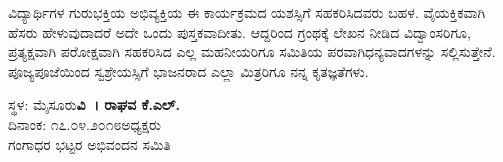 {ವಿದ್ಯಾರ್ಥಿಗಳ ಗುರುಭಕ್ತಿಯ ಅಭಿವ್ಯಕ್ತಿಯ ಈ ಕಾರ್ಯಕ್ರಮದ ಯಶಸ್ಸಿಗೆ ಸಹಕರಿಸಿ\-ದವರು ಬಹಳ. ವೈಯಕ್ತಿಕವಾಗಿ ಹೆಸರು ಹೇಳುವುದಾದರೆ ಅದೇ ಒಂದು ಪುಸ್ತಕವಾದೀತು. ಆದ್ದರಿಂದ ಗ್ರಂಥಕ್ಕೆ ಲೇಖನ ನೀಡಿದ ವಿದ್ವಾಂಸರಿಗೂ, ಪ್ರತ್ಯಕ್ಷವಾಗಿ ಪರೋಕ್ಷ\-ವಾಗಿ ಸಹಕರಿಸಿದ ಎಲ್ಲ ಮಹನೀಯರಿಗೂ ಸಮಿತಿಯ ಪರವಾಗಿ\break ಧನ್ಯವಾದಗಳನ್ನು ಸಲ್ಲಿಸುತ್ತೇನೆ. ಪೂಜ್ಯಪೂಜೆಯಿಂದ ಸ್ವಶ್ರೇಯಸ್ಸಿಗೆ ಭಾಜನರಾದ ಎಲ್ಲಾ ಮಿತ್ರರಿಗೂ ನನ್ನ ಕೃತಜ್ಞತೆಗಳು.
\bigskip

\noindent ಸ್ಥಳ: ಮೈಸೂರು\hfill				           \textbf{ವಿ~। ರಾಘವ ಕೆ.ಎಲ್.}\\
ದಿನಾಂಕ: ೧೭.೦೪.೨೦೧೮\hfill  						    ಅಧ್ಯಕ್ಷರು\\
\phantom{i}\hfill ಗಂಗಾಧರ ಭಟ್ಟರ ಅಭಿವಂದನ ಸಮಿತಿ


\articleend
}
